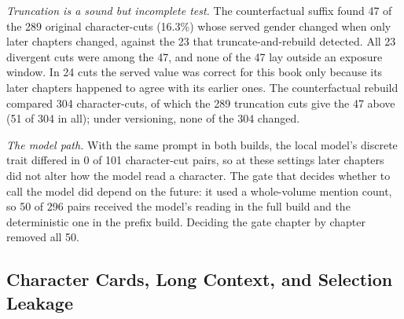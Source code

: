 \documentclass[sn-mathphys]{sn-jnl}%
\theoremstyle{thmstyleone}%
\theoremstyle{thmstyletwo}%
\theoremstyle{thmstylethree}%
\begin{document}
\emph{Truncation is a sound but incomplete test.} The counterfactual suffix found 47 of the 289 original character-cuts (16.3\%) whose served gender changed when only later chapters changed, against the 23 that truncate-and-rebuild detected. All 23 divergent cuts were among the 47, and none of the 47 lay outside an exposure window. In 24 cuts the served value was correct for this book only because its later chapters happened to agree with its earlier ones. The counterfactual rebuild compared 304 character-cuts, of which the 289 truncation cuts give the 47 above (51 of 304 in all); under versioning, none of the 304 changed.

\emph{The model path.} With the same prompt in both builds, the local model's discrete trait differed in 0 of 101 character-cut pairs, so at these settings later chapters did not alter how the model read a character. The gate that decides whether to call the model did depend on the future: it used a whole-volume mention count, so 50 of 296 pairs received the model's reading in the full build and the deterministic one in the prefix build. Deciding the gate chapter by chapter removed all 50.

\subsection{Character Cards, Long Context, and Selection Leakage}\label{sec:r-assistant}
\end{document}
